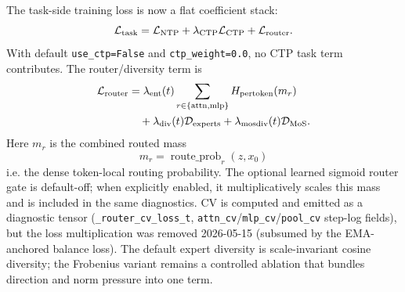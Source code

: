 \documentclass[11pt]{article}
\begin{document}
The task-side training loss is now a flat coefficient stack:
\[
  \mathcal{L}_{\rm task}
    = \mathcal{L}_{\rm NTP}
    + \lambda_{\rm CTP}\mathcal{L}_{\rm CTP}
    + \mathcal{L}_{\rm router}.
\]
With default \texttt{use\_ctp=False} and \texttt{ctp\_weight=0.0}, no CTP
task term contributes.  The router/diversity term is
\[
\begin{aligned}
  \mathcal{L}_{\rm router}
    &= \lambda_{\rm ent}(t)\sum_{r\in\{\mathrm{attn},\mathrm{mlp}\}}
       H_{\rm pertoken}(m_r) \\
    &\quad
     + \lambda_{\rm div}(t)\mathcal{D}_{\rm experts}
     + \lambda_{\rm mosdiv}(t)\mathcal{D}_{\rm MoS}.
\end{aligned}
\]
Here $m_r$ is the combined routed mass
\[
  m_r = \operatorname{route\_prob}_r(z,x_0)
\]
i.e. the dense token-local routing probability.  The optional learned sigmoid
router gate is default-off; when explicitly enabled, it multiplicatively
scales this mass and is included in the same diagnostics.  CV is computed
and emitted as a diagnostic tensor (\texttt{\_router\_cv\_loss\_t},
\texttt{attn\_cv}/\texttt{mlp\_cv}/\texttt{pool\_cv} step-log fields), but
the loss multiplication was removed 2026-05-15 (subsumed by the EMA-anchored
balance loss).  The default expert diversity is scale-invariant cosine
diversity; the Frobenius variant remains a controlled ablation that bundles
direction and norm pressure into one term.
\end{document}
